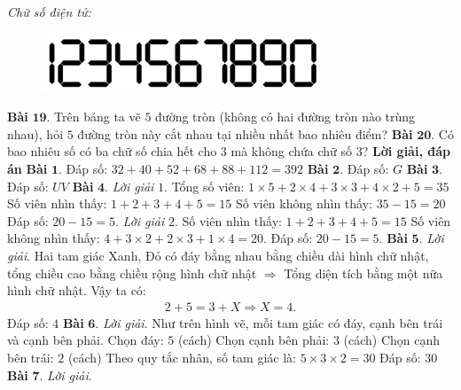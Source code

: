 \begin{multicols}{2}
	\vskip 0.1cm
	\textit{Chữ số điện tử:} 
	\begin{figure}[H]
		\centering
		\vspace*{-10pt}
		\captionsetup{labelformat= empty, justification=centering}
		\includegraphics[width=1\linewidth]{Bai18}
		\vspace*{-15pt}
	\end{figure}
	\textbf{\color{cackithi}Bài} $\pmb{19.}$ Trên bảng ta vẽ $5$ đường tròn (không có hai đường tròn nào trùng nhau), hỏi $5$ đường tròn này cắt nhau tại nhiều nhất bao nhiêu điểm? 
	\vskip 0.1cm
	\textbf{\color{cackithi}Bài} $\pmb{20.}$ Có bao nhiêu số có ba chữ số chia hết cho $3$ mà không chứa chữ số $3$?
	\vskip 0.1cm
	\textbf{\color{cackithi}Lời giải, đáp án}
	\vskip 0.1cm
	\textbf{\color{cackithi}Bài} $\pmb{1.}$ Đáp số: $32+40+52+68+88+112=392$
	\vskip 0.1cm
	\textbf{\color{cackithi}Bài} $\pmb{2.}$ Đáp số: $G$
	\vskip 0.1cm
	\textbf{\color{cackithi}Bài} $\pmb{3.}$ Đáp số: $UV$	 
	\vskip 0.1cm
	\textbf{\color{cackithi}Bài} $\pmb{4.}$
	\textit{Lời giải} $1$.
	Tổng số viên: $1\times5+2\times4+3\times3+4\times2+5 = 35$
	\vskip 0.1cm
	Số viên nhìn thấy: $1+2+3+4+5 = 15$
	\vskip 0.1cm
	Số viên không nhìn thấy: $35 - 15 = 20$
	\vskip 0.1cm
	Đáp số: $20 - 15 = 5$.
	\vskip 0.1cm
	\textit{Lời giải} $2$.
	Số viên nhìn thấy: $1+2+3+4+5 = 15$
	\vskip 0.1cm
	Số viên không nhìn thấy: $4 + 3\times2 + 2\times3 + 1\times4 = 20$.
	\vskip 0.1cm
	Đáp số: $20 - 15 = 5$.
	\vskip 0.1cm
	\textbf{\color{cackithi}Bài} $\pmb{5.}$ \textit{Lời giải}.
	Hai tam giác Xanh, Đỏ có đáy bằng nhau bằng chiều dài hình chữ nhật, tổng chiều cao bằng chiều rộng hình chữ nhật $\Rightarrow$ Tổng diện tích bằng một nữa hình chữ nhật. Vậy ta có:
	\begin{align*}
			2 + 5 = 3 + X \Rightarrow X = 4.
		\end{align*}
	Đáp số: $4$ 
	\vskip 0.1cm
	\textbf{\color{cackithi}Bài} $\pmb{6.}$ \textit{Lời giải}.
	Như trên hình vẽ, mỗi tam giác có đáy, cạnh bên trái và cạnh bên phải.
	\vskip 0.1cm
	Chọn đáy: $5$ (cách)
	\vskip 0.1cm
	Chọn cạnh bên phải: $3$ (cách) 
	\vskip 0.1cm
	Chọn cạnh bên trái: $2$ (cách) 
	\vskip 0.1cm
	Theo quy tắc nhân, số tam giác là: $5\times3\times2 = 30$
	\vskip 0.1cm
	Đáp số: $30$
	\vskip 0.1cm
	\textbf{\color{cackithi}Bài} $\pmb{7.}$ \textit{Lời giải}.

\end{multicols}
